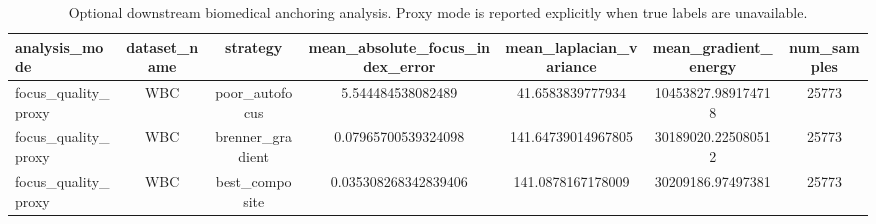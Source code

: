 \begin{table}[t]
\centering
\caption{Optional downstream biomedical anchoring analysis. Proxy mode is reported explicitly when true labels are unavailable.}
\begin{tabular}{lcccccc}
\hline
analysis_mode & dataset_name & strategy & mean_absolute_focus_index_error & mean_laplacian_variance & mean_gradient_energy & num_samples \\
\hline
focus\_quality\_proxy & WBC & poor\_autofocus & 5.544484538082489 & 41.6583839777934 & 10453827.989174718 & 25773 \\
focus\_quality\_proxy & WBC & brenner\_gradient & 0.07965700539324098 & 141.64739014967805 & 30189020.225080512 & 25773 \\
focus\_quality\_proxy & WBC & best\_composite & 0.035308268342839406 & 141.0878167178009 & 30209186.97497381 & 25773 \\
\hline
\end{tabular}
\end{table}